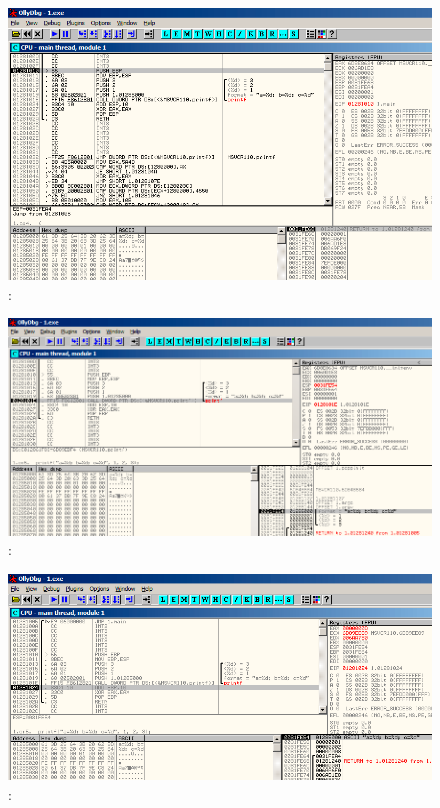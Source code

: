 \begin{figure}[H]
\centering
\includegraphics[scale=0.66]{patterns/03_printf/olly3_1.png}
\caption{\olly:  \main{}}
\label{fig:printf3_olly_1}
\end{figure}

\begin{figure}[H]
\centering
\includegraphics[scale=0.66]{patterns/03_printf/olly3_2.png}
\caption{\olly:  \printf{}}
\label{fig:printf3_olly_2}
\end{figure}

\begin{figure}[H]
\centering
\includegraphics[scale=0.66]{patterns/03_printf/olly3_3.png}
\caption{\olly:  \printf{}}
\label{fig:printf3_olly_3}
\end{figure}

